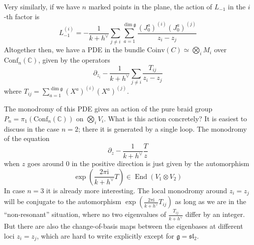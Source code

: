 \documentclass[12pt,letterpaper,reqno]{amsart}
\numberwithin{equation}{section}
\newcommand{\fg}{{\mathfrak g}}
\newcommand{\fsl}{{\mathfrak {sl}}}
\newcommand{\bbC}{\ensuremath{\mathbb C}}
\newcommand{\I}{{\mathrm i}}
\newcommand{\Coinv}{{\mathrm{Coinv}}}
\newcommand{\Conf}{\textrm{Conf}}
\DeclareMathOperator{\End}{End}
\begin{document}
\begin{example}
\begin{equation}
\end{equation}
Very similarly, if we have $n$ marked points in the plane, the action of $L_{-1}$ in the $i$-th factor is
\begin{equation}
  L^{(i)}_{-1} = - \frac{1}{k + h^\vee} \sum_{j \neq i} \sum_{a=1}^{\dim \fg} \frac{(J^a_0)^{(i)} (J^a_0)^{(j)}}{z_i - z_j}
\end{equation}
Altogether then, we have a PDE in the bundle $\Coinv(C) \simeq \bigotimes_i M_i$
over $\Conf_n(\bbC)$, given by the operators
\begin{equation} \label{eq:kz-kohno}
  \partial_{z_i} - \frac{1}{k + h^\vee} \sum_{j \neq i} \frac{T_{ij}}{z_i - z_j}
\end{equation}
where $T_{ij} = \sum_{a=1}^{\dim \fg} (X^a)^{(i)} (X^a)^{(j)}$.

The monodromy of this PDE gives an action of the pure braid group $P_n = \pi_1(\Conf_n(\bbC))$ 
on $\bigotimes_i V_i$. What is this action concretely?
It is easiest to discuss in the case $n=2$; there it is generated by a single loop.
The monodromy of the equation
\begin{equation}
  \partial_z - \frac{1}{k + h^\vee} \frac{T}{z}
\end{equation}
when $z$ goes around $0$ in the positive direction
is just given by the automorphism 
\begin{equation}
  \exp\left(\frac{2 \pi \I}{k + h^\vee} T\right) \in \End(V_1 \otimes V_2)
\end{equation}
In case $n=3$ it is already more interesting.
The local monodromy around $z_i = z_j$ will be conjugate to the automorphism
$\exp\left(\frac{2 \pi \I}{k + h^\vee} T_{ij}\right)$
as long as we are in the ``non-resonant'' situation, where
no two eigenvalues of
$\frac{T_{ij}}{k + h^\vee}$
differ by an integer.
But there are also the change-of-basis maps between the eigenbases at different loci $z_i = z_j$,
which are hard to write explicitly except for $\fg = \fsl_2$.


\end{example}
\end{document}

